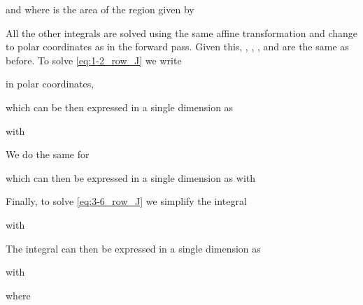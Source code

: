 \documentclass{article}
\begin{document}
and
 where  is the area of the region  given by



All the other integrals are solved using the same affine transformation and change to polar coordinates as in the forward pass. Given this, , , ,  and  are the same as before. 
To solve \eqref{eq:1-2_row_J} we write

in polar coordinates,

which can be then expressed in a single dimension as 

with

We do the same for

which can then be expressed in a single dimension as 
with

Finally, to solve \eqref{eq:3-6_row_J} we simplify the integral

with



The integral can then be expressed in a single dimension as 

with

where
\end{document}
